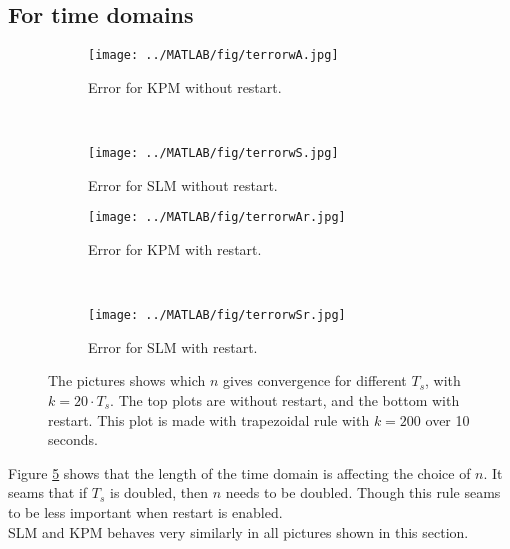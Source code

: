 \subsection{For time domains} %

\begin{figure}[H]
        \centering
        \begin{subfigure}[b]{0.45\textwidth}
                \texttt{[image: ../MATLAB/fig/terrorwA.jpg]}
                \caption{ Error for KPM without restart. }
                \label{fig:terrorwA}
        \end{subfigure}
		~
		\begin{subfigure}[b]{0.45\textwidth}
                \texttt{[image: ../MATLAB/fig/terrorwS.jpg]}
                \caption{ Error for SLM without restart. }
                \label{fig:terrorwS}
        \end{subfigure}
        
        \begin{subfigure}[b]{0.45\textwidth}
                \texttt{[image: ../MATLAB/fig/terrorwAr.jpg]}
                \caption{ Error for KPM with restart. }
                \label{fig:terrorwAr}
        \end{subfigure}
		~
		\begin{subfigure}[b]{0.45\textwidth}
                \texttt{[image: ../MATLAB/fig/terrorwSr.jpg]}
                \caption{ Error for SLM with restart. }
                \label{fig:terrorwSr}
        \end{subfigure}        
        
        \caption{ The pictures shows which $n$ gives convergence for different $T_s$, with $k = 20 \cdot T_s$. The top plots are without restart, and the bottom with restart. This plot is made with trapezoidal rule with $k = 200$ over 10 seconds. }
        \label{fig:rest}

\end{figure}
Figure \ref{fig:rest} shows that the length of the time domain is affecting the choice of $n$. It seams that if $T_s$ is doubled, then $n$ needs to be doubled. Though this rule seams to be less important when restart is enabled. \\
SLM and KPM behaves very similarly in all pictures shown in this section.

